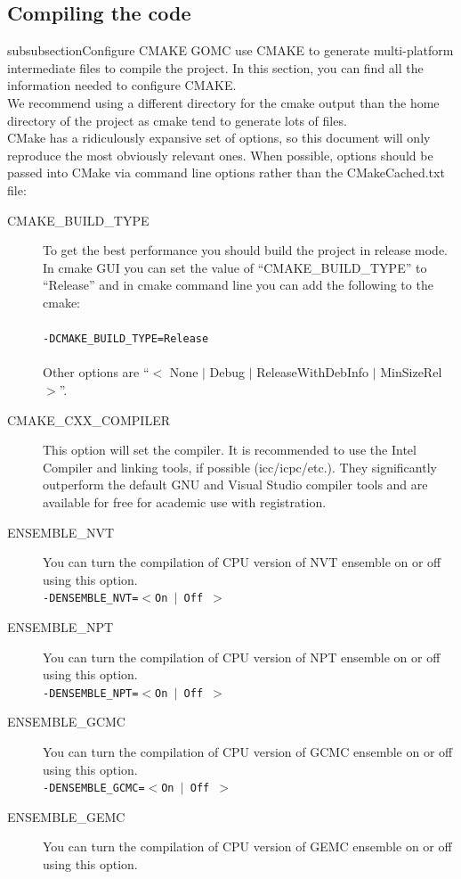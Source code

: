 \subsection{Compiling the code}
subsubsection{Configure CMAKE}
GOMC use CMAKE to generate multi-platform intermediate files to compile the project. In this section, you can find all the information needed to configure CMAKE.\\
We recommend using a different directory for the cmake output than the home directory of the project as cmake tend to generate lots of files.\\
CMake has a ridiculously expansive set of options, so this document will only reproduce the most obviously relevant ones. When possible, options should be passed into CMake via command line options rather than the CMakeCached.txt file:
\begin{description}
\item [CMAKE\_BUILD\_TYPE] To get the best performance you should build the project in release mode. In cmake GUI you can set the value of ``CMAKE\_BUILD\_TYPE'' to ``Release'' and in cmake command line you can add the following to the cmake:\\\\
\texttt{-DCMAKE\_BUILD\_TYPE=Release}\\\\
Other options are ``$<$ None $\mid$ Debug $\mid$ ReleaseWithDebInfo $\mid$ MinSizeRel $>$''.
\item [CMAKE\_CXX\_COMPILER] This option will set the compiler. It is recommended to use the Intel Compiler and linking tools, if possible (icc/icpc/etc.). They significantly outperform the default GNU and Visual Studio compiler tools and are available for free for academic use with registration.
\item [ENSEMBLE\_NVT] You can turn the compilation of CPU version of NVT ensemble on or off using this option.\\
\texttt{-DENSEMBLE\_NVT=$<$On $\mid$ Off $>$}
\item [ENSEMBLE\_NPT] You can turn the compilation of CPU version of NPT ensemble on or off using this option.\\
\texttt{-DENSEMBLE\_NPT=$<$On $\mid$ Off $>$}
\item [ENSEMBLE\_GCMC] You can turn the compilation of CPU version of GCMC ensemble on or off using this option.\\
\texttt{-DENSEMBLE\_GCMC=$<$On $\mid$ Off $>$}
\item [ENSEMBLE\_GEMC] You can turn the compilation of CPU version of GEMC ensemble on or off using this option.\\

\end{description}
